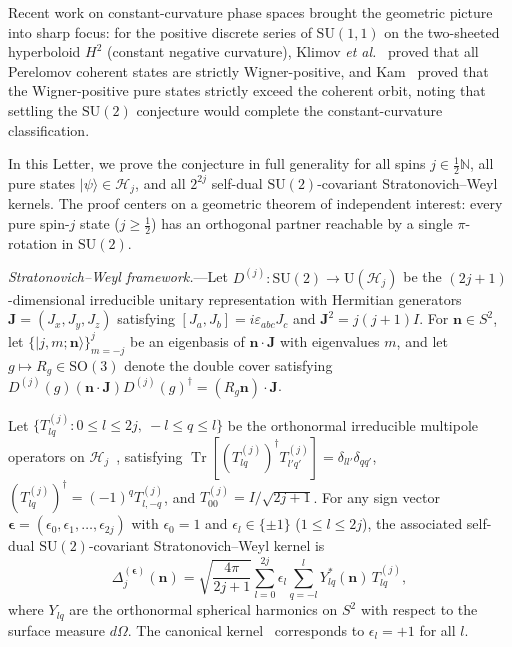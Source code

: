\documentclass[aps,prl,reprint,amsmath,amssymb,nofootinbib,floatfix]{revtex4-2}
\newcommand{\ket}[1]{\lvert #1 \rangle}
\newcommand{\Tr}{\operatorname{Tr}}
\newcommand{\bn}{\mathbf{n}}
\newcommand{\bJ}{\mathbf{J}}
\begin{document}
Recent work on constant-curvature phase spaces brought the geometric picture into sharp focus: for the positive discrete series of $\mathrm{SU}(1,1)$ on the two-sheeted hyperboloid $H^2$ (constant negative curvature), Klimov \textit{et al.}~\cite{Klimov2026} proved that all Perelomov coherent states are strictly Wigner-positive, and Kam~\cite{Kam2026} proved that the Wigner-positive pure states strictly exceed the coherent orbit, noting that settling the $\mathrm{SU}(2)$ conjecture would complete the constant-curvature classification.

In this Letter, we prove the conjecture in full generality for all spins $j \in \frac{1}{2}\mathbb{N}$, all pure states $\ket{\psi} \in \mathcal{H}_j$, and all $2^{2j}$ self-dual $\mathrm{SU}(2)$-covariant Stratonovich--Weyl kernels. The proof centers on a geometric theorem of independent interest: every pure spin-$j$ state ($j \ge \frac{1}{2}$) has an orthogonal partner reachable by a single $\pi$-rotation in $\mathrm{SU}(2)$.

\emph{Stratonovich--Weyl framework.}---Let $D^{(j)} : \mathrm{SU}(2) \to \mathrm{U}(\mathcal{H}_j)$ be the $(2j+1)$-dimensional irreducible unitary representation with Hermitian generators $\bJ = (J_x, J_y, J_z)$ satisfying $[J_a, J_b] = i\varepsilon_{abc} J_c$ and $\bJ^2 = j(j+1)I$. For $\bn \in S^2$, let $\{\ket{j,m;\bn}\}_{m=-j}^{j}$ be an eigenbasis of $\bn\cdot\bJ$ with eigenvalues $m$, and let $g \mapsto R_g \in \mathrm{SO}(3)$ denote the double cover satisfying $D^{(j)}(g)(\bn\cdot\bJ)D^{(j)}(g)^\dagger = (R_g\bn)\cdot\bJ$.

Let $\{T^{(j)}_{lq} : 0 \le l \le 2j,\ -l \le q \le l\}$ be the orthonormal irreducible multipole operators on $\mathcal{H}_j$~\cite{VarillyGraciaBondia1989,Davis2021}, satisfying $\Tr[(T^{(j)}_{lq})^\dagger T^{(j)}_{l'q'}] = \delta_{ll'}\delta_{qq'}$, $(T^{(j)}_{lq})^\dagger = (-1)^q T^{(j)}_{l,-q}$, and $T^{(j)}_{00} = I/\sqrt{2j+1}$. For any sign vector $\boldsymbol{\epsilon} = (\epsilon_0, \epsilon_1, \dots, \epsilon_{2j})$ with $\epsilon_0 = 1$ and $\epsilon_l \in \{\pm 1\}$ ($1 \le l \le 2j$), the associated self-dual $\mathrm{SU}(2)$-covariant Stratonovich--Weyl kernel is
\begin{equation}\label{eq:SW-kernel}
\Delta_j^{(\boldsymbol{\epsilon})}(\bn)
= \sqrt{\frac{4\pi}{2j+1}} \sum_{l=0}^{2j} \epsilon_l \sum_{q=-l}^{l} Y_{lq}^*(\bn)\, T^{(j)}_{lq},
\end{equation}
where $Y_{lq}$ are the orthonormal spherical harmonics on $S^2$ with respect to the surface measure $d\Omega$. The canonical kernel~\cite{VarillyGraciaBondia1989,Davis2021,Davis2023,Kam2026} corresponds to $\epsilon_l = +1$ for all $l$.
\end{document}
